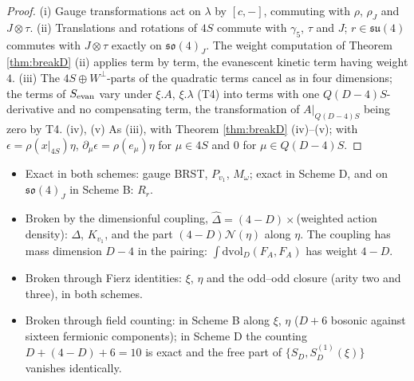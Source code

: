 \begin{proof}
(i) Gauge transformations act on $\lambda$ by $[c,-]$, commuting with $\rho$, $\rho_J$ and $J\otimes\tau$. (ii) Translations and rotations of $4S$ commute with $\gamma_5$, $\tau$ and $J$; $r\in\mathfrak{su}(4)$ commutes with $J\otimes\tau$ exactly on $\mathfrak{so}(4)_J$. The weight computation of Theorem \ref{thm:breakD} (ii) applies term by term, the evanescent kinetic term having weight $4$. (iii) The $4S\oplus W^\perp$-parts of the quadratic terms cancel as in four dimensions; the terms of $S_{\rm evan}$ vary under $\xi.A$, $\xi.\lambda$ (T4) into terms with one $Q(D{-}4)S$-derivative and no compensating term, the transformation of $A|_{Q(D-4)S}$ being zero by T4. (iv), (v) As (iii), with Theorem \ref{thm:breakD} (iv)--(v); with $\epsilon=\rho(x|_{4S})\eta$, $\partial_\mu\epsilon=\rho(e_\mu)\eta$ for $\mu\in4S$ and $0$ for $\mu\in Q(D{-}4)S$.
\end{proof}

\begin{corollary}
\label{cor:fail}
\mbox{}\begin{itemize}
\item Exact in both schemes: gauge BRST, $P_{v_1}$, $M_\omega$; exact in Scheme D, and on $\mathfrak{so}(4)_J$ in Scheme B: $R_r$.
\item Broken by the dimensionful coupling, $\widehat\Delta=(4-D)\times$(weighted action density): $\Delta$, $K_{v_1}$, and the part $(4-D)\mathcal N(\eta)$ along $\eta$. The coupling has mass dimension $D-4$ in the pairing: $\int\mathrm{dvol}_D(F_A,F_A)$ has weight $4-D$.
\item Broken through Fierz identities: $\xi$, $\eta$ and the odd--odd closure (arity two and three), in both schemes.
\item Broken through field counting: in Scheme B along $\xi$, $\eta$ ($D+6$ bosonic against sixteen fermionic components); in Scheme D the counting $D+(4-D)+6=10$ is exact and the free part of $\{S_D,S^{(1)}_D(\xi)\}$ vanishes identically.
\end{itemize}
\end{corollary}

